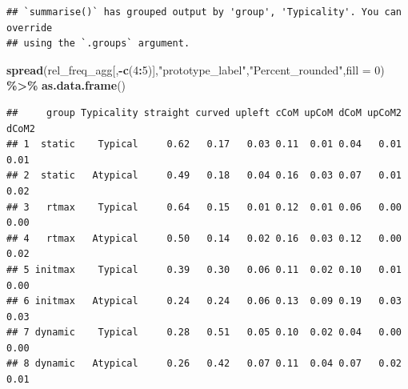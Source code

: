 \documentclass[
]{article}
\newenvironment{Shaded}{\begin{snugshade}}{\end{snugshade}}
\newcommand{\AttributeTok}[1]{\textcolor[rgb]{0.13,0.29,0.53}{#1}}
\newcommand{\DecValTok}[1]{\textcolor[rgb]{0.00,0.00,0.81}{#1}}
\newcommand{\FunctionTok}[1]{\textcolor[rgb]{0.13,0.29,0.53}{\textbf{#1}}}
\newcommand{\NormalTok}[1]{#1}
\newcommand{\OtherTok}[1]{\textcolor[rgb]{0.56,0.35,0.01}{#1}}
\newcommand{\SpecialCharTok}[1]{\textcolor[rgb]{0.81,0.36,0.00}{\textbf{#1}}}
\newcommand{\StringTok}[1]{\textcolor[rgb]{0.31,0.60,0.02}{#1}}
\begin{document}
\begin{Shaded}
\end{Shaded}

\begin{verbatim}
## `summarise()` has grouped output by 'group', 'Typicality'. You can override
## using the `.groups` argument.
\end{verbatim}

\begin{Shaded}
\begin{Highlighting}[]
\FunctionTok{spread}\NormalTok{(rel\_freq\_agg[,}\SpecialCharTok{{-}}\FunctionTok{c}\NormalTok{(}\DecValTok{4}\SpecialCharTok{:}\DecValTok{5}\NormalTok{)],}\StringTok{"prototype\_label"}\NormalTok{,}\StringTok{"Percent\_rounded"}\NormalTok{,}\AttributeTok{fill =} \DecValTok{0}\NormalTok{) }\SpecialCharTok{\%\textgreater{}\%}
  \FunctionTok{as.data.frame}\NormalTok{()}
\end{Highlighting}
\end{Shaded}

\begin{verbatim}
##     group Typicality straight curved upleft cCoM upCoM dCoM upCoM2 dCoM2
## 1  static    Typical     0.62   0.17   0.03 0.11  0.01 0.04   0.01  0.01
## 2  static   Atypical     0.49   0.18   0.04 0.16  0.03 0.07   0.01  0.02
## 3   rtmax    Typical     0.64   0.15   0.01 0.12  0.01 0.06   0.00  0.00
## 4   rtmax   Atypical     0.50   0.14   0.02 0.16  0.03 0.12   0.00  0.02
## 5 initmax    Typical     0.39   0.30   0.06 0.11  0.02 0.10   0.01  0.00
## 6 initmax   Atypical     0.24   0.24   0.06 0.13  0.09 0.19   0.03  0.03
## 7 dynamic    Typical     0.28   0.51   0.05 0.10  0.02 0.04   0.00  0.00
## 8 dynamic   Atypical     0.26   0.42   0.07 0.11  0.04 0.07   0.02  0.01
\end{verbatim}
\end{document}
